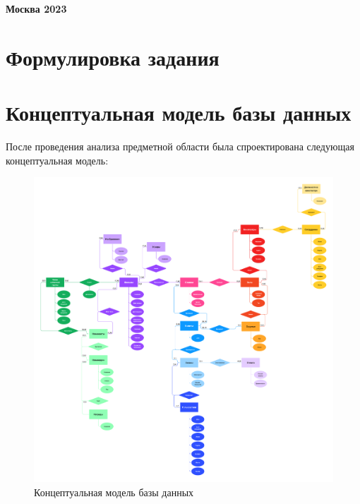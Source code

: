 \documentclass[a4paper,12pt]{article}
\renewcommand{\^}[2]{#1^{\, #2} \kern -1pt}
\newcommand{\1}{\kern 1pt}
\newcommand{\0}{\kern -1pt}
\begin{document}
\begin{titlepage}
		
		\vspace{15em}
		
		\begin{center}
			\textbf{Москва 2023}
		\end{center}
	\end{titlepage}
	
	\newpage 
	\tableofcontents
	\setcounter{page}{2}
	
	\newpage
	
	\section{Формулировка задания}
	
	\newpage
	
	\section{Концептуальная модель базы данных}
	
	После проведения анализа предметной области была спроектирована следующая концептуальная модель:
	
	\begin{figure}[h]
		\hspace{-1.75cm}
		\includegraphics[scale=0.094,page=1]{Концептуальная модель.pdf}
		\caption{Концептуальная модель базы данных}
	\end{figure}
	
\end{document}
